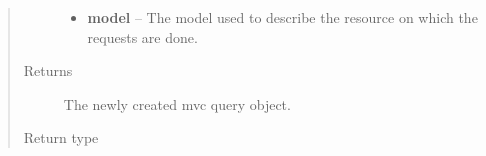 \documentclass[letterpaper,10pt,english]{sphinxmanual}
\begin{document}
\begin{fulllineitems}
\begin{fulllineitems}
\begin{quote}
\begin{description}
\begin{itemize}
\item {} 
\textbf{model} -- The model used to describe the resource on which the requests are done.

\end{itemize}

\item[{Returns}] \leavevmode
The newly created mvc query object.

\item[{Return type}] \leavevmode
{\hyperref[features/mvc:fantastico.mvc.models.model_sort.ModelSort]{}}

\end{description}\end{quote}

\end{fulllineitems}


\end{fulllineitems}

\end{document}
